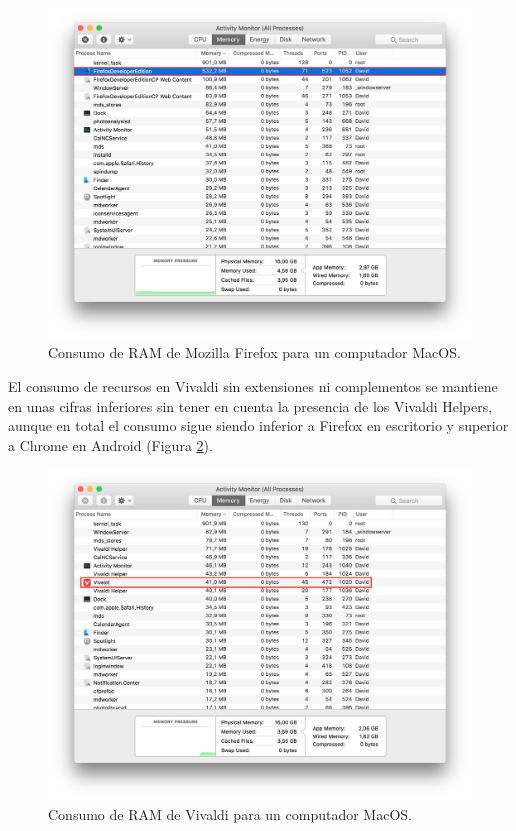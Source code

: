 \begin{figure}[!t]
\begin{center}
\includegraphics[width=0.75\linewidth]{./6_EvalEmpirica/Img/firefoxRAM.png}
\end{center}
\caption{Consumo de RAM de Mozilla Firefox para un computador MacOS.}
\label{firefoxRAM}
\end{figure}

El consumo de recursos en Vivaldi sin extensiones ni complementos se mantiene en unas cifras inferiores sin tener en cuenta la presencia de los Vivaldi Helpers, aunque en total el consumo sigue siendo inferior a Firefox en escritorio y superior a Chrome en Android (Figura \ref{vivaldiRAM}).

\begin{figure}[!t]
\begin{center}
\includegraphics[width=0.75\linewidth]{./6_EvalEmpirica/Img/vivaldiRAM.png}
\end{center}
\caption{Consumo de RAM de Vivaldi para un computador MacOS.}
\label{vivaldiRAM}
\end{figure}

